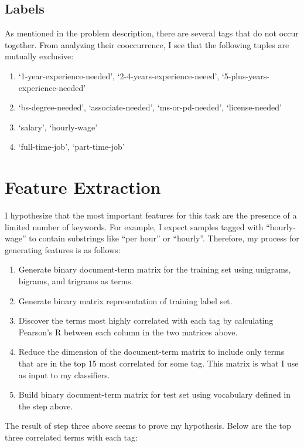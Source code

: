 \documentclass{article}
\begin{document}
\subsection{Labels}
As mentioned in the problem description, there are several tags that do not occur together. From analyzing their cooccurrence, I see that the following tuples are mutually exclusive:

\begin{enumerate}
	\item `1-year-experience-needed', `2-4-years-experience-neeed', `5-plus-years-experience-needed'
	\item `bs-degree-needed', `associate-needed', `ms-or-pd-needed', `license-needed'
	\item `salary', `hourly-wage'
	\item `full-time-job', `part-time-job'
\end{enumerate}

\section{Feature Extraction}
I hypothesize that the most important features for this task are the presence of a limited number of keywords. For example, I expect samples tagged with ``hourly-wage'' to contain substrings like ``per hour'' or ``hourly''. Therefore, my process for generating features is as follows:

\begin{enumerate}
	\item Generate binary document-term matrix for the training set using unigrams, bigrams, and trigrams as terms.
	\item Generate binary matrix representation of training label set.
	\item Discover the terms most highly correlated with each tag by calculating Pearson's R between each column in the two matrices above.
	\item Reduce the dimension of the document-term matrix to include only terms that are in the top 15 most correlated for some tag. This matrix is what I use as input to my classifiers.
	\item Build binary document-term matrix for test set using vocabulary defined in the step above.
\end{enumerate}

The result of step three above seems to prove my hypothesis. Below are the top three correlated terms with each tag:
\end{document}

